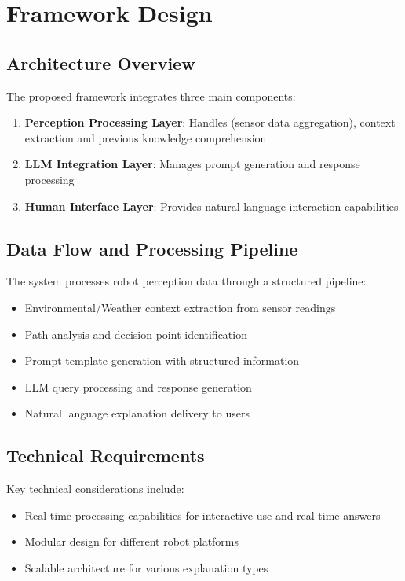 \section{Framework Design}

\subsection{Architecture Overview}

The proposed framework integrates three main components:
\begin{enumerate}
    \item \textbf{Perception Processing Layer}: Handles (sensor data aggregation), context extraction and previous knowledge comprehension
    \item \textbf{LLM Integration Layer}: Manages prompt generation and response processing
    \item \textbf{Human Interface Layer}: Provides natural language interaction capabilities
\end{enumerate}

\subsection{Data Flow and Processing Pipeline}

The system processes robot perception data through a structured pipeline:
\begin{itemize}
    \item Environmental/Weather context extraction from sensor readings
    \item Path analysis and decision point identification
    \item Prompt template generation with structured information
    \item LLM query processing and response generation
    \item Natural language explanation delivery to users
\end{itemize}

\subsection{Technical Requirements}

Key technical considerations include:
\begin{itemize}
    \item Real-time processing capabilities for interactive use and real-time answers
    \item Modular design for different robot platforms
    \item Scalable architecture for various explanation types
\end{itemize}
